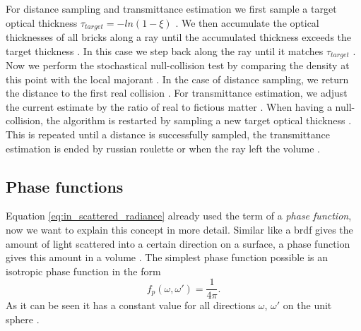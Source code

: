 For distance sampling and transmittance estimation we first sample a target optical thickness $\tau_{target}=-ln(1-\xi)$ \cite[p. 6]{brick_grid}.
We then accumulate the optical thicknesses of all bricks along a ray until the accumulated thickness exceeds the target thickness \cite[p. 6]{brick_grid}.
In this case we step back along the ray until it matches $\tau_{target}$ \cite[p. 6]{brick_grid}.
Now we perform the stochastical null-collision test by comparing the density at this point with the local majorant \cite[p. 6]{brick_grid}.
In the case of distance sampling, we return the distance to the first real collision \cite[p. 6]{brick_grid}.
For transmittance estimation, we adjust the current estimate by the ratio of real to fictious matter \cite[p. 6]{brick_grid}.
When having a null-collision, the algorithm is restarted by sampling a new target optical thickness \cite[p. 6]{brick_grid}.
This is repeated until a distance is successfully sampled, the transmittance estimation is ended by russian roulette or when the ray left the volume \cite[p. 6]{brick_grid}.

\subsection{Phase functions}
\label{subsec:phase_function}
Equation \ref{eq:in_scattered_radiance} already used the term of a \textit{phase function}, now we want to explain this concept in more detail.
Similar like a \acs{brdf} gives the amount of light scattered into a certain direction on a surface, a phase function gives this amount in a volume \cite[p. 2]{novak_overview}.
The simplest phase function possible is an isotropic phase function in the form
\begin{equation}
    f_p(\omega, \omega')=\frac{1}{4\pi}.
\end{equation}
As it can be seen it has a constant value for all directions $\omega$, $\omega'$ on the unit sphere \cite[p. 2]{novak_overview}.

